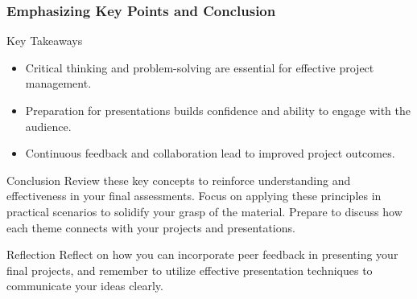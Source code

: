 \documentclass[aspectratio=169]{beamer}
\begin{document}
\begin{frame}[fragile]
    \frametitle{Emphasizing Key Points and Conclusion}
    \begin{block}{Key Takeaways}
        \begin{itemize}
            \item Critical thinking and problem-solving are essential for effective project management.
            \item Preparation for presentations builds confidence and ability to engage with the audience.
            \item Continuous feedback and collaboration lead to improved project outcomes.
        \end{itemize}
    \end{block}

    \begin{block}{Conclusion}
        Review these key concepts to reinforce understanding and effectiveness in your final assessments. Focus on applying these principles in practical scenarios to solidify your grasp of the material. Prepare to discuss how each theme connects with your projects and presentations.
    \end{block}

    \begin{block}{Reflection}
        Reflect on how you can incorporate peer feedback in presenting your final projects, and remember to utilize effective presentation techniques to communicate your ideas clearly.
    \end{block}
\end{frame}
\end{document}
